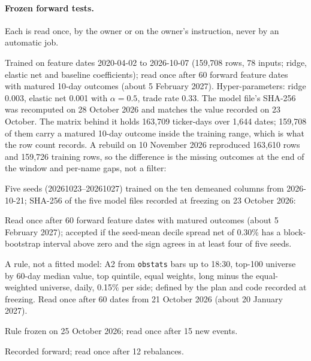 \paragraph{Frozen forward tests.} Each is read once, by the owner or on the owner's instruction, never by an automatic job.
\begin{description}[leftmargin=1.2em,style=nextline]
\item[Composite.] Trained on feature dates 2020-04-02 to 2026-10-07 (159,708 rows, 78 inputs; ridge, elastic net and baseline coefficients); read once after 60 forward feature dates with matured 10-day outcomes (about 5 February 2027). Hyper-parameters: ridge 0.003, elastic net 0.001 with $\alpha=0.5$, trade rate 0.33. The model file's SHA-256 was recomputed on 28 October 2026 and matches the value recorded on 23 October. The matrix behind it holds 163,709 ticker-days over 1,644 dates; 159,708 of them carry a matured 10-day outcome inside the training range, which is what the row count records. A rebuild on 10 November 2026 reproduced 163,610 rows and 159,726 training rows, so the difference is the missing outcomes at the end of the window and per-name gaps, not a filter:
\par{}
\item[Decile-spread ensemble.] Five seeds (20261023--20261027) trained on the ten demeaned columns from 2026-10-21; SHA-256 of the five model files recorded at freezing on 23 October 2026:
\par{}
Read once after 60 forward feature dates with matured outcomes (about 5 February 2027); accepted if the seed-mean decile spread net of 0.30\% has a block-bootstrap interval above zero and the sign agrees in at least four of five seeds.
\item[Frozen A2 rule.] A rule, not a fitted model: A2 from \texttt{obstats} bars up to 18:30, top-100 universe by 60-day median value, top quintile, equal weights, long minus the equal-weighted universe, daily, 0.15\% per side; defined by the plan and code recorded at freezing. Read once after 60 dates from 21 October 2026 (about 20 January 2027).
\item[Dividend run-up.] Rule frozen on 25 October 2026; read once after 15 new events.
\item[Shadow ridge book.] Recorded forward; read once after 12 rebalances.
\end{description}

